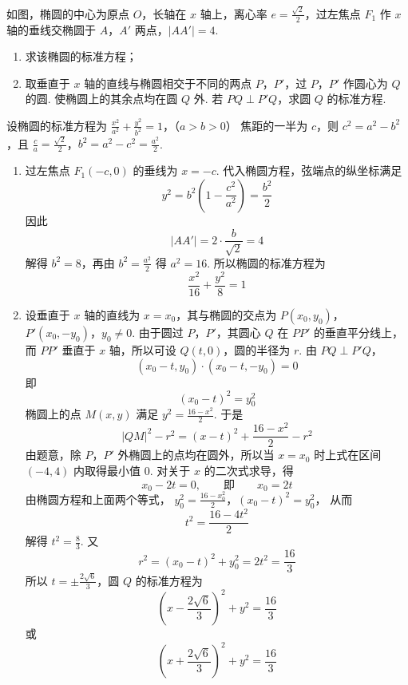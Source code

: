 \begin{problem}
如图，椭圆的中心为原点 \(O\)，长轴在 \(x\) 轴上，离心率 \(e = \frac{\sqrt{2}}{2}\)，过左焦点 \(F_{1}\) 作 \(x\) 轴的垂线交椭圆于 \(A\)，\(A'\) 两点，\(|AA'| = 4\).

\begin{enumerate}
\item 求该椭圆的标准方程；
\item 取垂直于 \(x\) 轴的直线与椭圆相交于不同的两点 \(P\)，\(P'\)，过 \(P\)，\(P'\) 作圆心为 \(Q\) 的圆. 使椭圆上的其余点均在圆 \(Q\) 外. 若 \(PQ \perp P'Q\)，求圆 \(Q\) 的标准方程.
\end{enumerate}


\begin{solution}
设椭圆的标准方程为
\(\frac{x^2}{a^2}+\frac{y^2}{b^2}=1\)，（\(a>b>0\)）
焦距的一半为 \(c\)，则 \(c^2=a^2-b^2\)，且
\(\frac{c}{a}=\frac{\sqrt{2}}{2}\)，\(b^2=a^2-c^2=\frac{a^2}{2}\).

\begin{enumerate}
\item 过左焦点 \(F_1(-c,0)\) 的垂线为 \(x=-c\). 代入椭圆方程，弦端点的纵坐标满足
\[
y^2=b^2\left(1-\frac{c^2}{a^2}\right)=\frac{b^2}{2}
\]
因此
\[
|AA'|=2\cdot\frac{b}{\sqrt{2}}=4
\]
解得 \(b^2=8\)，再由 \(b^2=\frac{a^2}{2}\) 得 \(a^2=16\). 所以椭圆的标准方程为
\[
\frac{x^2}{16}+\frac{y^2}{8}=1
\]

\item 设垂直于 \(x\) 轴的直线为 \(x=x_0\)，其与椭圆的交点为
\(P(x_0,y_0)\)，\(P'(x_0,-y_0)\)，\(y_0\ne0\).
由于圆过 \(P\)，\(P'\)，其圆心 \(Q\) 在 \(PP'\) 的垂直平分线上，而 \(PP'\) 垂直于 \(x\) 轴，所以可设 \(Q(t,0)\)，圆的半径为 \(r\). 由 \(PQ\perp P'Q\)，
\[
(x_0-t,y_0)\cdot(x_0-t,-y_0)=0
\]
即
\[
(x_0-t)^2=y_0^2
\]
椭圆上的点 \(M(x,y)\) 满足 \(y^2=\frac{16-x^2}{2}\). 于是
\[
|QM|^2-r^2=(x-t)^2+\frac{16-x^2}{2}-r^2
\]
由题意，除 \(P\)，\(P'\) 外椭圆上的点均在圆外，所以当 \(x=x_0\) 时上式在区间 \((-4,4)\) 内取得最小值 \(0\). 对关于 \(x\) 的二次式求导，得
\[
x_0-2t=0,\qquad\text{即}\qquad x_0=2t
\]
由椭圆方程和上面两个等式，
\(y_0^2=\frac{16-x_0^2}{2}\)，\((x_0-t)^2=y_0^2\)，
从而
\[
t^2=\frac{16-4t^2}{2}
\]
解得 \(t^2=\frac{8}{3}\). 又
\[
r^2=(x_0-t)^2+y_0^2=2t^2=\frac{16}{3}
\]
所以 \(t=\pm\frac{2\sqrt{6}}{3}\)，圆 \(Q\) 的标准方程为
\[
\left(x-\frac{2\sqrt{6}}{3}\right)^2+y^2=\frac{16}{3}
\]
或
\[
\left(x+\frac{2\sqrt{6}}{3}\right)^2+y^2=\frac{16}{3}
\]
\end{enumerate}
\end{solution}

\end{problem}

